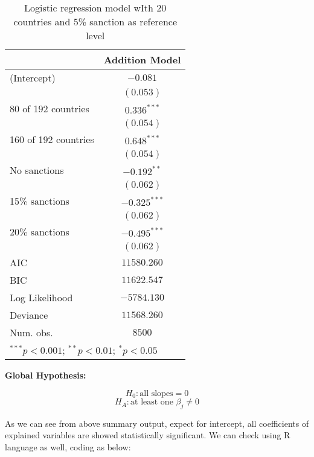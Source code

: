 \documentclass[12pt,letterpaper]{article}
\begin{document}
\begin{enumerate}
\begin{enumerate}
		\begin{table}[h] 
			\begin{center}
				\caption{Logistic regression model wIth 20 countries and 5\% sanction as reference level}
				\begin{tabular}{l c} 
					\hline &  Addition Model  \\
					\hline(Intercept)                         & $-0.081$       \\
					& $(0.053)$      \\
					80 of 192  countries                  & $0.336^{***}$  \\
					& $(0.054)$      \\
					160 of 192 countries                   & $0.648^{***}$  \\  
					& $(0.054)$      \\
					No sanctions & $-0.192^{**}$  \\ 
					& $(0.062)$      \\
					15\% sanctions & $-0.325^{***}$ \\ 
					& $(0.062)$      \\
					20\% sanctions & $-0.495^{***}$ \\ 
					& $(0.062)$      \\
					\hline
					AIC  & $11580.260$    \\
					BIC                                & $11622.547$    \\
					Log Likelihood                      & $-5784.130$    \\
					Deviance                            & $11568.260$    \\
					Num. obs.                           & $8500$     \\
					\hline\multicolumn{2}{l}{\scriptsize{$^{***}p<0.001$; $^{**}p<0.01$; $^{*}p<0.05$}}
				\end{tabular} \label{table:coefficients}
			\end{center}
		\end{table}
		
		\noindent \textbf{Global Hypothesis:}
		
		$$H_0: \text{all~slopes} = 0$$
		$$H_A: \text{at~least~one~} \beta_j \neq 0$$
		
		\noindent As we can see from above summary output, expect for intercept, all coefficients of explained variables are showed statistically significant. We can check using R language as well, coding as below:
		
		
		

\end{enumerate}
\end{enumerate}
\end{document}
